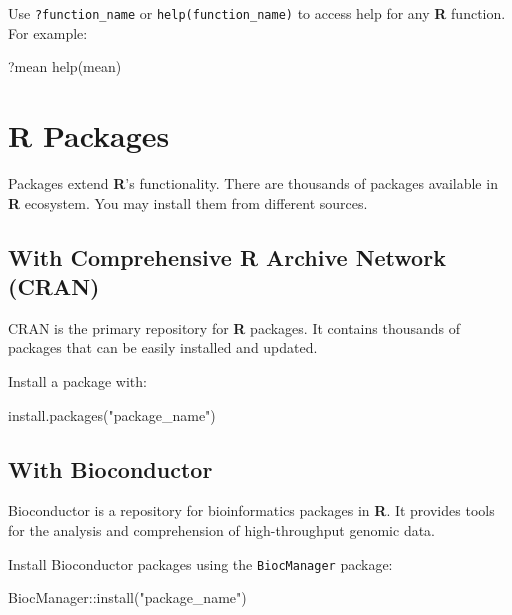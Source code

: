 \documentclass[
  letterpaper,
  DIV=11,
  numbers=noendperiod]{scrreprt}
\newenvironment{Shaded}{\begin{snugshade}}{\end{snugshade}}
\newcommand{\FunctionTok}[1]{\textcolor[rgb]{0.28,0.35,0.67}{#1}}
\newcommand{\NormalTok}[1]{\textcolor[rgb]{0.00,0.23,0.31}{#1}}
\newcommand{\SpecialCharTok}[1]{\textcolor[rgb]{0.37,0.37,0.37}{#1}}
\newcommand{\StringTok}[1]{\textcolor[rgb]{0.13,0.47,0.30}{#1}}
\begin{document}
Use \texttt{?function\_name} or \texttt{help(function\_name)} to access
help for any \textbf{R} function. For example:

\begin{Shaded}
\begin{Highlighting}[]
\NormalTok{?mean}
\FunctionTok{help}\NormalTok{(mean)}
\end{Highlighting}
\end{Shaded}

\section{R Packages}\label{r-packages}

Packages extend \textbf{R}'s functionality. There are thousands of
packages available in \textbf{R} ecosystem. You may install them from
different sources.

\subsection{With Comprehensive R Archive Network
(CRAN)}\label{with-comprehensive-r-archive-network-cran}

CRAN is the primary repository for \textbf{R} packages. It contains
thousands of packages that can be easily installed and updated.

Install a package with:

\begin{Shaded}
\begin{Highlighting}[]
\FunctionTok{install.packages}\NormalTok{(}\StringTok{"package\_name"}\NormalTok{)}
\end{Highlighting}
\end{Shaded}

\subsection{With Bioconductor}\label{with-bioconductor}

Bioconductor is a repository for bioinformatics packages in \textbf{R}.
It provides tools for the analysis and comprehension of high-throughput
genomic data.

Install Bioconductor packages using the \texttt{BiocManager} package:

\begin{Shaded}
\begin{Highlighting}[]
\NormalTok{BiocManager}\SpecialCharTok{::}\FunctionTok{install}\NormalTok{(}\StringTok{"package\_name"}\NormalTok{)}
\end{Highlighting}
\end{Shaded}
\end{document}
